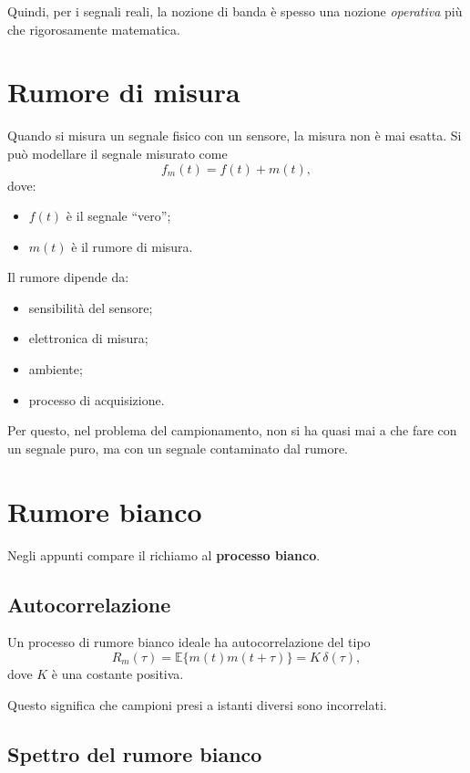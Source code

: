 Quindi, per i segnali reali, la nozione di banda è spesso una nozione \emph{operativa}
più che rigorosamente matematica.

\section{Rumore di misura}

Quando si misura un segnale fisico con un sensore, la misura non è mai esatta.
Si può modellare il segnale misurato come
\[
f_m(t)=f(t)+m(t),
\]
dove:
\begin{itemize}
    \item \(f(t)\) è il segnale ``vero'';
    \item \(m(t)\) è il rumore di misura.
\end{itemize}

Il rumore dipende da:
\begin{itemize}
    \item sensibilità del sensore;
    \item elettronica di misura;
    \item ambiente;
    \item processo di acquisizione.
\end{itemize}

Per questo, nel problema del campionamento, non si ha quasi mai a che fare
con un segnale puro, ma con un segnale contaminato dal rumore.

\section{Rumore bianco}

Negli appunti compare il richiamo al \textbf{processo bianco}.

\subsection{Autocorrelazione}

Un processo di rumore bianco ideale ha autocorrelazione del tipo
\[
R_m(\tau)=\mathbb{E}\{m(t)m(t+\tau)\}=K\,\delta(\tau),
\]
dove \(K\) è una costante positiva.

Questo significa che campioni presi a istanti diversi sono incorrelati.

\subsection{Spettro del rumore bianco}

